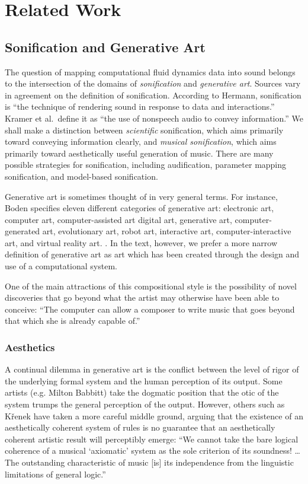 \chapter[Related Work]{Related Work}
\label{chap:chap2}
\section{Sonification and Generative Art}

The question of mapping computational fluid dynamics data into sound belongs to the intersection of the domains of {\em sonification} and {\em generative art}. Sources vary in agreement on the definition of sonification. According to Hermann, sonification is ``the technique of rendering sound in response to data and interactions.'' \cite{hermann2011sonification} Kramer et al.~define it as ``the use of nonspeech audio to convey information.'' \cite{kramer2010sonification} We shall make a distinction between {\em scientific} sonification, which aims primarily toward conveying information clearly, and {\em musical sonification}, which aims primarily toward aesthetically useful generation of music. There are many possible strategies for sonification, including audification, parameter mapping sonification, and model-based sonification. \cite{hermann2011sonification} 

Generative art is sometimes thought of in very general terms. For instance, Boden specifies eleven different categories of generative art: electronic art, computer art, computer-assisted art digital art, generative art, computer-generated art, evolutionary art, robot art, interactive art, computer-interactive art, and virtual reality art. \cite{boden2009generative}. In the text, however, we prefer a more narrow definition of generative art as art which has been created through the design and use of a computational system.

One of the main attractions of this compositional style is the possibility of novel discoveries that go beyond what the artist may otherwise have been able to conceive: ``The computer can allow a composer to write music that goes beyond that which she is already capable of.'' \cite{roads2015composing}

\subsection{Aesthetics}
A continual dilemma in generative art is the conflict between the level of rigor of the underlying formal system and the human perception of its output. Some artists (e.g. Milton Babbitt) take the dogmatic position that the otic of the system trumps the general perception of the output. \cite{babbitt1958cares}  However, others such as K{\v{r}}enek have taken a more careful middle ground, arguing that the existence of an aesthetically coherent system of rules is no guarantee that an aesthetically coherent artistic result will perceptibly emerge: ``We cannot take the bare logical coherence of a musical `axiomatic' system as the sole criterion of its soundness! \dots The outstanding characteristic of music [is] its independence from the linguistic limitations of general logic.'' \cite{kvrenek1939music}